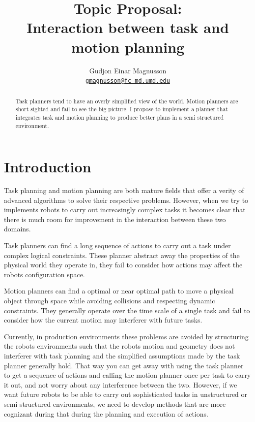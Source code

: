 \documentclass[letterpaper, 10 pt, conference]{ieeeconf}  %
\title{
Topic Proposal: \\Interaction between task and motion planning
}
\author{
Gudjon Einar Magnusson
\\ \href{mailto:gmagnusson@fc-md.umd.edu}{\tt\small gmagnusson@fc-md.umd.edu}
}
\begin{document}
\maketitle
\thispagestyle{empty}
\pagestyle{empty}


\begin{abstract}

Task planners tend to have an overly simplified view of the world. Motion planners are short sighted and fail to see the big picture. I propose to implement a planner that integrates task and motion planning to produce better plans in a semi structured environment. 

\end{abstract}


\section{Introduction}

Task planning and motion planning are both mature fields that offer a verity of advanced algorithms to solve their respective problems. However, when we try to implements robots to carry out increasingly complex tasks it becomes clear that there is much room for improvement in the interaction between these two domains. 

Task planners can find a long sequence of actions to carry out a task under complex logical constraints. These planner abstract away the properties of the physical world they operate in, they fail to consider how actions may affect the robots configuration space.

Motion planners can find a optimal or near optimal path to move a physical object through space while avoiding collisions and respecting dynamic constraints. They generally operate over the time scale of a single task and fail to consider how the current motion may interferer with future tasks.

Currently, in production environments these problems are avoided by structuring the robots environments such that the robots motion and geometry does not interferer with task planning and the simplified assumptions made by the task planner generally hold. That way you can get away with using the task planner to get a sequence of actions and calling the motion planner once per task to carry it out, and not worry about any interference between the two. However, if we want future robots to be able to carry out sophisticated tasks in unstructured or semi-structured environments, we need to develop methods that are more cognizant during that during the planning and execution of actions.
\end{document}
